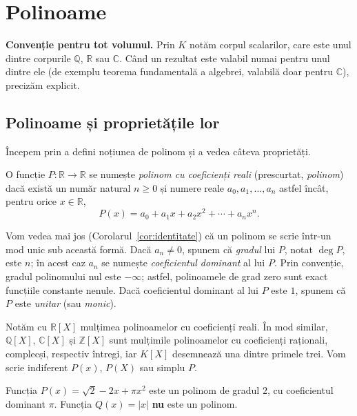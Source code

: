 \setlength{\parskip}{8pt plus 3pt minus 1pt}
\addtolength{\jot}{3pt}

\chapter{Polinoame}\label{ch:polinoame}

\textbf{Convenție pentru tot volumul.} Prin $K$ notăm corpul scalarilor, care este unul dintre corpurile $\mathbb{Q}$, $\mathbb{R}$ sau $\mathbb{C}$. Când un rezultat este valabil numai pentru unul dintre ele (de exemplu teorema fundamentală a algebrei, valabilă doar pentru $\mathbb{C}$), precizăm explicit.

\section{Polinoame și proprietățile lor}

Începem prin a defini noțiunea de polinom și a vedea câteva proprietăți.

\begin{definitie}
O funcție $P : \mathbb{R} \to \mathbb{R}$ se numește \emph{polinom cu coeficienți reali} (prescurtat, \emph{polinom}) dacă există un număr natural $n \ge 0$ și numere reale $a_0, a_1, \ldots, a_n$ astfel încât, pentru orice $x \in \mathbb{R}$,
\[
P(x) = a_0 + a_1 x + a_2 x^2 + \cdots + a_n x^n.
\]
\end{definitie}

Vom vedea mai jos (Corolarul~\ref{cor:identitate}) că un polinom se scrie într-un mod unic sub această formă. Dacă $a_n \neq 0$, spunem că \emph{gradul} lui $P$, notat $\deg P$, este $n$; în acest caz $a_n$ se numește \emph{coeficientul dominant} al lui $P$. Prin convenție, gradul polinomului nul este $-\infty$; astfel, polinoamele de grad zero sunt exact funcțiile constante nenule. Dacă coeficientul dominant al lui $P$ este $1$, spunem că $P$ este \emph{unitar} (sau \emph{monic}).

Notăm cu $\mathbb{R}[X]$ mulțimea polinoamelor cu coeficienți reali. În mod similar, $\mathbb{Q}[X]$, $\mathbb{C}[X]$ și $\mathbb{Z}[X]$ sunt mulțimile polinoamelor cu coeficienți raționali, complecși, respectiv întregi, iar $K[X]$ desemnează una dintre primele trei. Vom scrie indiferent $P(x)$, $P(X)$ sau simplu $P$.

\begin{exemplu}
Funcția $P(x) = \sqrt{2} - 2x + \pi x^2$ este un polinom de gradul $2$, cu coeficientul dominant $\pi$. Funcția $Q(x) = |x|$ \textbf{nu} este un polinom.
\end{exemplu}

